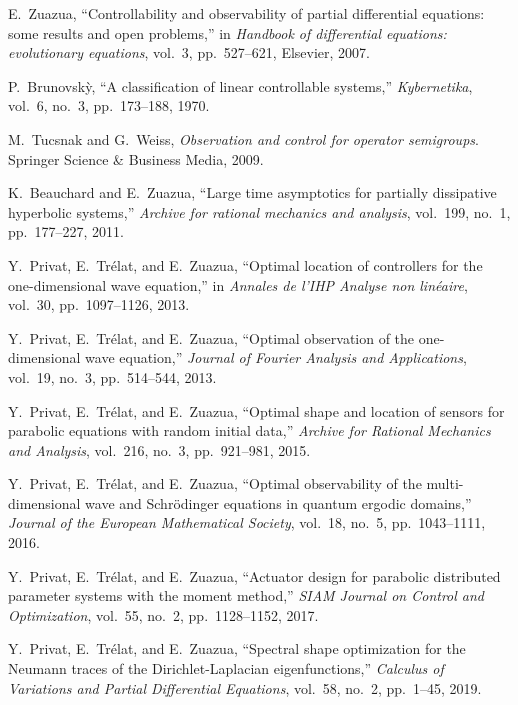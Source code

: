 \documentclass[journal,twoside,web]{ieeecolor}
\begin{document}
\begin{thebibliography}{10}

E.~Zuazua, ``Controllability and observability of partial differential
  equations: some results and open problems,'' in {\em Handbook of differential
  equations: evolutionary equations}, vol.~3, pp.~527--621, Elsevier, 2007.

P.~Brunovsk{\`y}, ``A classification of linear controllable systems,'' {\em
  Kybernetika}, vol.~6, no.~3, pp.~173--188, 1970.

M.~Tucsnak and G.~Weiss, {\em Observation and control for operator semigroups}.
\newblock Springer Science \& Business Media, 2009.

K.~Beauchard and E.~Zuazua, ``Large time asymptotics for partially dissipative
  hyperbolic systems,'' {\em Archive for rational mechanics and analysis},
  vol.~199, no.~1, pp.~177--227, 2011.

Y.~Privat, E.~Tr{\'e}lat, and E.~Zuazua, ``Optimal location of controllers for
  the one-dimensional wave equation,'' in {\em Annales de l'IHP Analyse non
  lin{\'e}aire}, vol.~30, pp.~1097--1126, 2013.

Y.~Privat, E.~Tr{\'e}lat, and E.~Zuazua, ``Optimal observation of the
  one-dimensional wave equation,'' {\em Journal of Fourier Analysis and
  Applications}, vol.~19, no.~3, pp.~514--544, 2013.

Y.~Privat, E.~Tr{\'e}lat, and E.~Zuazua, ``Optimal shape and location of
  sensors for parabolic equations with random initial data,'' {\em Archive for
  Rational Mechanics and Analysis}, vol.~216, no.~3, pp.~921--981, 2015.

Y.~Privat, E.~Tr{\'e}lat, and E.~Zuazua, ``Optimal observability of the
  multi-dimensional wave and {Schr{\"o}dinger equations} in quantum ergodic
  domains,'' {\em Journal of the European Mathematical Society}, vol.~18,
  no.~5, pp.~1043--1111, 2016.

Y.~Privat, E.~Tr{\'e}lat, and E.~Zuazua, ``Actuator design for parabolic
  distributed parameter systems with the moment method,'' {\em SIAM Journal on
  Control and Optimization}, vol.~55, no.~2, pp.~1128--1152, 2017.

Y.~Privat, E.~Tr{\'e}lat, and E.~Zuazua, ``Spectral shape optimization for the
  {N}eumann traces of the {Dirichlet-Laplacian} eigenfunctions,'' {\em Calculus
  of Variations and Partial Differential Equations}, vol.~58, no.~2, pp.~1--45,
  2019.


\end{thebibliography}
\end{document}
